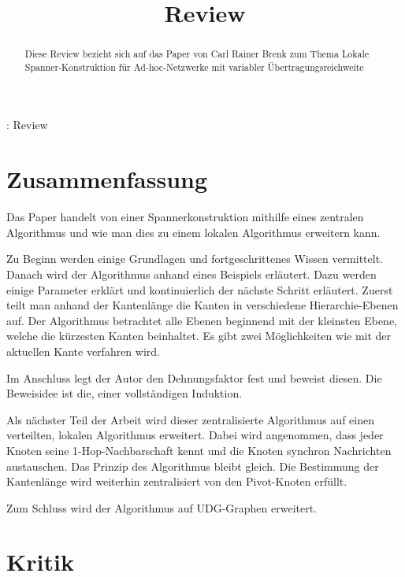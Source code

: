 \documentclass[a4paper,twoside]{IEEEtran}
\newcommand{\seminarteilnehmer}{}
\newcommand{\seminartitel}{Review}
\begin{document}
\title{\seminartitel}
\author{\seminarteilnehmer}

%
{\seminarteilnehmer: \seminartitel}


\maketitle

\begin{abstract}
Diese Review bezieht sich auf das Paper von Carl Rainer Brenk zum Thema \glqq Lokale Spanner-Konstruktion für Ad-hoc-Netzwerke
mit variabler Übertragungsreichweite\grqq
\end{abstract}

\section{Zusammenfassung}
Das Paper handelt von einer Spannerkonstruktion mithilfe eines zentralen Algorithmus und wie man dies zu einem lokalen Algorithmus erweitern kann.

Zu Beginn werden einige Grundlagen und fortgeschrittenes Wissen vermittelt.
Danach wird der Algorithmus anhand eines Beispiels erläutert.
Dazu werden einige Parameter erklärt und kontinuierlich der nächste Schritt erläutert.
Zuerst teilt man anhand der Kantenlänge die Kanten in verschiedene Hierarchie-Ebenen auf.
Der Algorithmus betrachtet alle Ebenen beginnend mit der kleinsten Ebene, welche die kürzesten Kanten beinhaltet. 
Es gibt zwei Möglichkeiten wie mit der aktuellen Kante verfahren wird.

Im Anschluss legt der Autor den Dehnungsfaktor fest und beweist diesen.
Die Beweisidee ist die, einer vollständigen Induktion.

Als nächster Teil der Arbeit wird dieser zentralisierte Algorithmus auf einen verteilten, lokalen Algorithmus erweitert.
Dabei wird angenommen, dass jeder Knoten seine 1-Hop-Nachbarschaft kennt und die Knoten synchron Nachrichten austauschen.
Das Prinzip des Algorithmus bleibt gleich. 
Die Bestimmung der Kantenlänge wird weiterhin zentralisiert von den Pivot-Knoten erfüllt.

Zum Schluss wird der Algorithmus auf UDG-Graphen erweitert.




\section{Kritik}
\end{document}
